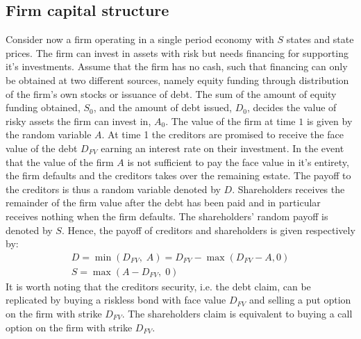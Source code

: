 \documentclass[../main.tex]{subfiles}
\begin{document}
    \subsection{Firm capital structure}
        Consider now a firm operating in a single period economy with $S$ states and state prices.
        The firm can invest in assets with risk but needs financing for supporting it's investments.
        Assume that the firm has no cash, such that financing can only be obtained at two different sources, namely equity funding through distribution of the firm's own stocks or issuance of debt.
        The sum of the amount of equity funding obtained, $S_{0}$, and the amount of debt issued, $D_{0}$, decides the value of risky assets the firm can invest in, $A_{0}$.
        The value of the firm at time $1$ is given by the random variable $A$.
        At time 1 the creditors are promised to receive the face value of the debt $D_{FV}$ earning an interest rate on their investment.
        In the event that the value of the firm $A$ is not sufficient to pay the face value in it's entirety, the firm defaults and the creditors takes over the remaining estate.
        The payoff to the creditors is thus a random variable denoted by $D$.
        Shareholders receives the remainder of the firm value after the debt has been paid and in particular receives nothing when the firm defaults.
        The shareholders' random payoff is denoted by $S$.
        Hence, the payoff of creditors and shareholders is given respectively by:
            \begin{gather}
                D = \min\left(
                        D_{FV},\; A
                    \right)
                    = D_{FV} - \max\left(
                        D_{FV} - A, 0
                    \right) \label{eqn:legacy-creditor-payoff}\\
                S
                    = \max\left(
                        A - D_{FV},\; 0
                    \right)
            \end{gather}
        It is worth noting that the creditors security, i.e. the debt claim, can be replicated by buying a riskless bond with face value $D_{FV}$ and selling a put option on the firm with strike $D_{FV}$.
        The shareholders claim is equivalent to buying a call option on the firm with strike $D_{FV}$.
\end{document}
